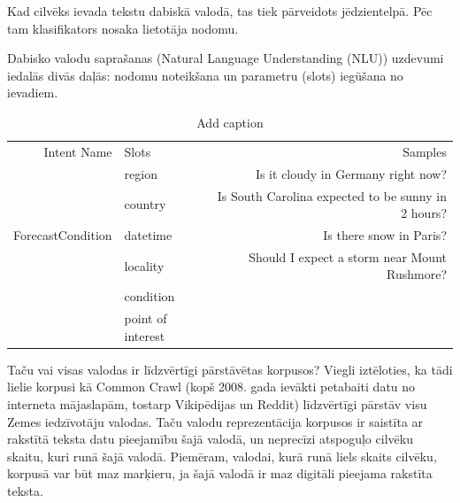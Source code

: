 Kad cilvēks ievada tekstu dabiskā valodā, tas tiek pārveidots jēdzientelpā. Pēc tam klasifikators nosaka lietotāja nodomu.

Dabisko valodu saprašanas (Natural Language Understanding (NLU)) uzdevumi iedalās divās daļās: nodomu noteikšana un parametru (slots) iegūšana no ievadiem.


\begin{table}[htbp]
  \centering
  \caption{Add caption}
    \begin{tabular}{rlr}
    Intent Name &  Slots & Samples \\
          & \textcolor[rgb]{ .439,  .188,  .627}{ region} & Is it \textcolor[rgb]{ 1,  .753,  0}{cloudy} in \textcolor[rgb]{ 1,  0,  0}{Germany} right now? \\
          & \textcolor[rgb]{ 1,  0,  0}{ country} & Is \textcolor[rgb]{ .439,  .188,  .627}{South Carolina} expected to be sunny in 2 hours? \\
    ForecastCondition & \textcolor[rgb]{ .573,  .816,  .314}{ datetime} & Is there \textcolor[rgb]{ 1,  .753,  0}{snow} in Paris? \\
          & \textcolor[rgb]{ 0,  .69,  .941}{ locality} & Should I expect a \textcolor[rgb]{ 1,  .753,  0}{storm} near Mount Rushmore? \\
          & \textcolor[rgb]{ 1,  .753,  0}{ condition} &  \\
          & \textcolor[rgb]{ .929,  .49,  .192}{ point of interest} &  \\
    \end{tabular}%
  \label{tab:slots}%
\end{table}%









Taču vai visas valodas ir līdzvērtīgi pārstāvētas korpusos? Viegli iztēloties, ka tādi lielie korpusi kā Common Crawl (kopš 2008. gada ievākti petabaiti datu no interneta mājaslapām, tostarp Vikipēdijas un Reddit) līdzvērtīgi pārstāv visu Zemes iedzīvotāju valodas. Taču valodu reprezentācija korpusos ir saistīta ar rakstītā teksta datu pieejamību šajā valodā, un neprecīzi atspoguļo cilvēku skaitu, kuri runā šajā valodā. Piemēram, valodai, kurā runā liels skaits cilvēku, korpusā var būt maz marķieru, ja šajā valodā ir maz digitāli pieejama rakstīta teksta.

